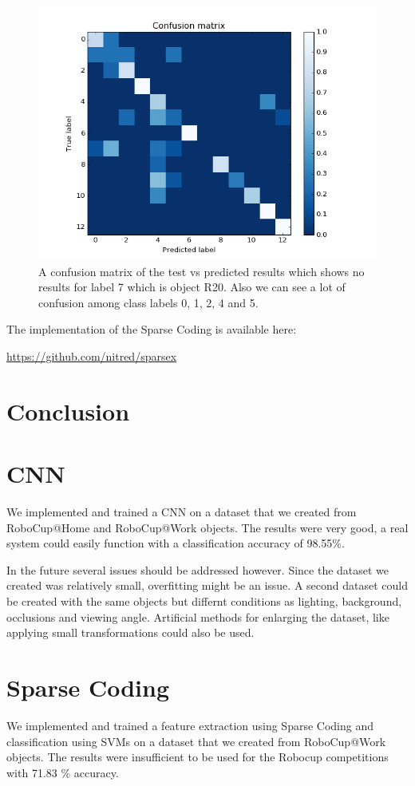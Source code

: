 \documentclass[	DIV=calc,%
				paper=a4,%
				fontsize=11pt,%
				twocolumn]{scrartcl}	 %
\begin{document}
\begin{figure}[H]
    \centering
    \includegraphics[width=0.8\linewidth]{data/sc_data/sc_atwork_confusion_matrix.png}
    \caption{A confusion matrix of the test vs predicted results which shows no results for label 7 which is object R20. Also we can see a lot of confusion among class labels 0, 1, 2, 4 and 5.}
    \label{sc_atwork_confusion_matrix}
\end{figure}


The implementation of the Sparse Coding is available here: \begin{small}\url{https://github.com/nitred/sparsex}\end{small}


\section{Conclusion}

\section*{CNN}
We implemented and trained a CNN on a dataset that we created from RoboCup@Home and RoboCup@Work objects. The results were very good, a real system could easily function with a classification accuracy of 98.55\%. 

In the future several issues should be addressed however. Since the dataset we created was relatively small, overfitting might be an issue. A second dataset could be created with the same objects but differnt conditions as lighting, background, occlusions and viewing angle. Artificial methods for enlarging the dataset, like applying small transformations could also be used.

\section*{Sparse Coding}
We implemented and trained a feature extraction using Sparse Coding and classification using SVMs on a dataset that we created from RoboCup@Work objects. The results were insufficient to be used for the Robocup competitions with 71.83 \% accuracy.
\end{document}
